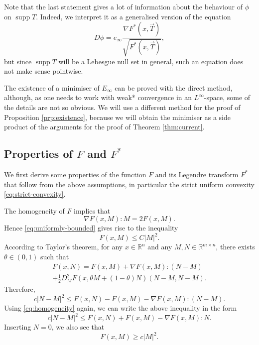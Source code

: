 \documentclass[a4paper]{article}
\newcommand{\R}{\mathbb{R}}
\newcommand{\grad}{\nabla}
\DeclareMathOperator{\supp}{supp}
\theoremstyle{definition}
\theoremstyle{remark}
\begin{document}
Note that the last statement gives a lot of information about the behaviour
of $\phi$ on $\supp T$. Indeed, we interpret it as a generalised version of
the equation
\[
D\phi = e_\infty \frac{\grad F^*(x, \vec{T})}{\sqrt{F^*(x, \vec{T})}},
\]
but since $\supp T$ will be a Lebesgue null set in general, such an equation
does not make sense pointwise.

The existence of a minimiser of $E_\infty$ can be proved with the direct method,
although, as one needs to work with weak* convergence in an $L^\infty$-space, some
of the details are not so obvious. We will use a different method for the proof of
Proposition \ref{prp:existence}, because we will obtain the minimiser as a side product
of the arguments for the proof of Theorem \ref{thm:current}.




\subsection{Properties of $F$ and $F^*$}

We first derive some properties of the function $F$ and its Legendre transform
$F^*$ that follow from the above assumptions, in particular the strict
uniform convexity \eqref{eq:strict-convexity}.

The homogeneity of $F$ implies that
\begin{equation} \label{eq:homogeneity}
\grad F(x, M) : M = 2F(x, M).
\end{equation}
Hence \eqref{eq:uniformly-bounded} gives rise to the inequality
\[
F(x, M) \le C|M|^2.
\]
According to Taylor's theorem, for any $x \in \R^n$ and any
$M, N \in \R^{m \times n}$, there exists $\theta \in (0, 1)$ such that
\begin{multline*}
F(x, N) = F(x, M) + \grad F(x, M) : (N - M) \\
+ \frac{1}{2} D_M^2 F(x, \theta M + (1 - \theta) N) (N - M, N - M).
\end{multline*}
Therefore,
\begin{equation} \label{eq:convexity1}
c|N - M|^2 \le F(x, N) - F(x, M) - \grad F(x, M) : (N - M).
\end{equation}
Using \eqref{eq:homogeneity} again, we can write the above inequality in the form
\begin{equation} \label{eq:convexity2}
c|N - M|^2 \le F(x, N) + F(x, M) - \grad F(x, M) : N.
\end{equation}
Inserting $N = 0$, we also see that
\[
F(x, M) \ge c|M|^2.
\]
\end{document}
